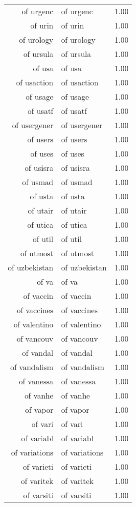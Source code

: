 \begin{table}[ht]
\begin{tabular}{rlr}
  of urgenc & of urgenc & 1.00 \\ 
  of urin & of urin & 1.00 \\ 
  of urology & of urology & 1.00 \\ 
  of ursula & of ursula & 1.00 \\ 
  of usa & of usa & 1.00 \\ 
  of usaction & of usaction & 1.00 \\ 
  of usage & of usage & 1.00 \\ 
  of usatf & of usatf & 1.00 \\ 
  of usergener & of usergener & 1.00 \\ 
  of users & of users & 1.00 \\ 
  of uses & of uses & 1.00 \\ 
  of usisra & of usisra & 1.00 \\ 
  of usmad & of usmad & 1.00 \\ 
  of usta & of usta & 1.00 \\ 
  of utair & of utair & 1.00 \\ 
  of utica & of utica & 1.00 \\ 
  of util & of util & 1.00 \\ 
  of utmost & of utmost & 1.00 \\ 
  of uzbekistan & of uzbekistan & 1.00 \\ 
  of va & of va & 1.00 \\ 
  of vaccin & of vaccin & 1.00 \\ 
  of vaccines & of vaccines & 1.00 \\ 
  of valentino & of valentino & 1.00 \\ 
  of vancouv & of vancouv & 1.00 \\ 
  of vandal & of vandal & 1.00 \\ 
  of vandalism & of vandalism & 1.00 \\ 
  of vanessa & of vanessa & 1.00 \\ 
  of vanhe & of vanhe & 1.00 \\ 
  of vapor & of vapor & 1.00 \\ 
  of vari & of vari & 1.00 \\ 
  of variabl & of variabl & 1.00 \\ 
  of variations & of variations & 1.00 \\ 
  of varieti & of varieti & 1.00 \\ 
  of varitek & of varitek & 1.00 \\ 
  of varsiti & of varsiti & 1.00 \\ 

\end{tabular}
\end{table}

